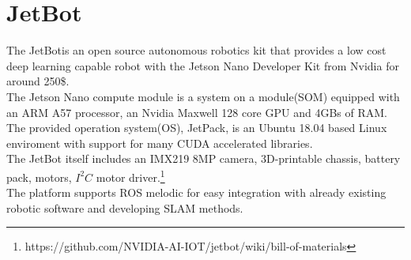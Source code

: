 \documentclass[class=article, crop=false]{standalone}
\begin{document}
\section{JetBot}\label{sec:jetbot}
The JetBot\footnotemark is an open source autonomous robotics kit that provides a low cost deep learning capable robot with the Jetson Nano Developer Kit from Nvidia for around 250\$. \\
\indent
The Jetson Nano compute module is a system on a module(SOM) equipped with an ARM A57 processor, an Nvidia Maxwell 128 core GPU and 4GBs of RAM. The provided operation system(OS), JetPack, is an Ubuntu 18.04 based Linux enviroment with support for many CUDA accelerated libraries. \\
\indent
The JetBot itself includes an IMX219 8MP camera, 3D-printable chassis, battery pack, motors, $ I^2C $ motor driver.\footnote{https://github.com/NVIDIA-AI-IOT/jetbot/wiki/bill-of-materials} \\
\indent
The platform supports ROS melodic for easy integration with already existing robotic software and developing SLAM methods.

\end{document}
